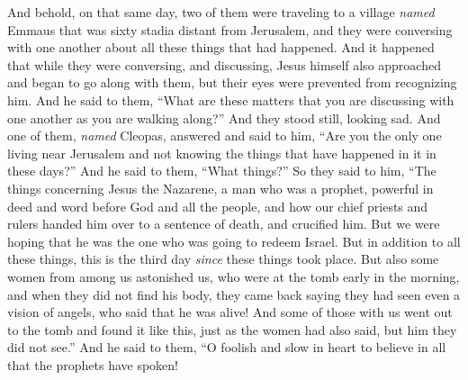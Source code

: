 \begin{biblechapter}
 And behold, on that same day, two of them were traveling to a village \textit{named} Emmaus that was sixty stadia distant from Jerusalem,
\verse and they were conversing with one another about all these things that had happened.
\verse And it happened that while they were conversing, and discussing, Jesus himself also approached and began to go along with them,
\verse but their eyes were prevented from recognizing him.
\verse And he said to them, “What are these matters that you are discussing with one another as you are walking along?” And they stood still, looking sad.
\verse And one of them, \textit{named} Cleopas, answered and said to him, “Are you the only one living near Jerusalem and not knowing the things that have happened in it in these days?”
\verse And he said to them, “What things?” So they said to him, “The things concerning Jesus the Nazarene, a man who was a prophet, powerful in deed and word before God and all the people,
\verse and how our chief priests and rulers handed him over to a sentence of death, and crucified him.
\verse But we were hoping that he was the one who was going to redeem Israel. But in addition to all these things, this is the third day \textit{since} these things took place.
\verse But also some women from among us astonished us, who were at the tomb early in the morning,
\verse and when they did not find his body, they came back saying they had seen even a vision of angels, who said that he was alive!
\verse And some of those with us went out to the tomb and found it like this, just as the women had also said, but him they did not see.”
\verse And he said to them, “O foolish and slow in heart to believe in all that the prophets have spoken!

\end{biblechapter}
